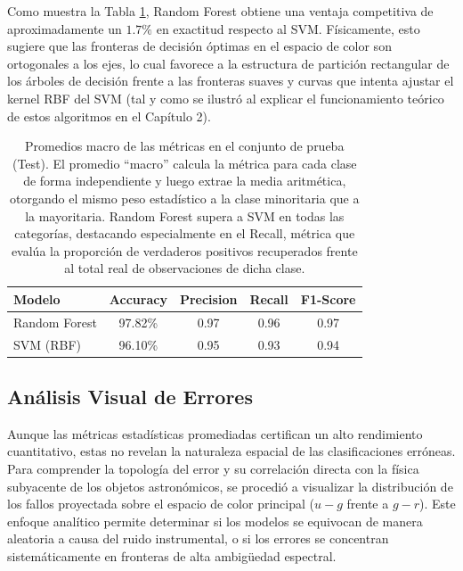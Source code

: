\documentclass[12pt, a4paper]{report}
\begin{document}
Como muestra la Tabla \ref{tab:comparativa_fase1}, Random Forest obtiene una ventaja competitiva de aproximadamente un $1.7\%$ en exactitud respecto al SVM. Físicamente, esto sugiere que las fronteras de decisión óptimas en el espacio de color son ortogonales a los ejes, lo cual favorece a la estructura de partición rectangular de los árboles de decisión frente a las fronteras suaves y curvas que intenta ajustar el kernel RBF del SVM (tal y como se ilustró al explicar el funcionamiento teórico de estos algoritmos en el Capítulo 2).

\begin{table}[H]
\centering
\renewcommand{\arraystretch}{1.2}
\begin{tabular}{|l|c|c|c|c|}
\hline
\textbf{Modelo} & \textbf{Accuracy} & \textbf{Precision} & \textbf{Recall} & \textbf{F1-Score} \\ \hline
Random Forest & 97.82\% & 0.97 & 0.96 & 0.97 \\ \hline
SVM (RBF) & 96.10\% & 0.95 & 0.93 & 0.94 \\ \hline
\end{tabular}
\caption{Promedios macro de las métricas en el conjunto de prueba (Test). El promedio ``macro'' calcula la métrica para cada clase de forma independiente y luego extrae la media aritmética, otorgando el mismo peso estadístico a la clase minoritaria que a la mayoritaria. Random Forest supera a SVM en todas las categorías, destacando especialmente en el Recall, métrica que evalúa la proporción de verdaderos positivos recuperados frente al total real de observaciones de dicha clase.}
\label{tab:comparativa_fase1}
\end{table}

\subsection{Análisis Visual de Errores}

Aunque las métricas estadísticas promediadas certifican un alto rendimiento cuantitativo, estas no revelan la naturaleza espacial de las clasificaciones erróneas. Para comprender la topología del error y su correlación directa con la física subyacente de los objetos astronómicos, se procedió a visualizar la distribución de los fallos proyectada sobre el espacio de color principal ($u-g$ frente a $g-r$). Este enfoque analítico permite determinar si los modelos se equivocan de manera aleatoria a causa del ruido instrumental, o si los errores se concentran sistemáticamente en fronteras de alta ambigüedad espectral.
\end{document}
